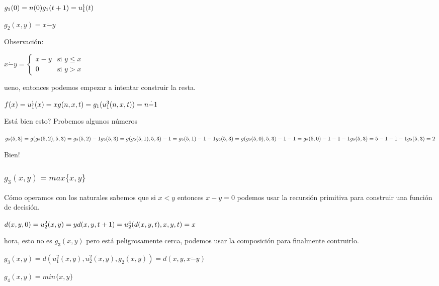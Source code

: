 \documentclass[11pt]{article} %
\newcommand{\desarrollo}[2]{

\hspace{2em}\parbox{\textwidth}{#1}

}
\begin{document}
\desarrollo{$
g_1(0) = n(0)\\
g_1(t+1) = u^1_1(t)
$}

\subsubsection{$g_2(x,y)=x\dot-y$}

Observación:

\desarrollo{$
x\dot-y =
\begin{cases}
  x - y & \text{si } y \le x \\
  0     & \text{si } y > x
\end{cases}
$}

Bueno, entonces podemos empezar a intentar construir la resta.

\desarrollo{$
f(x) = u^1_1(x) = x \\
g(n, x, t) = g_1(u^3_1(n,x,t)) = n \dot- 1
$}

¿Está bien esto? Probemos algunos números

\desarrollo{$
g_2(5, 3) = g(g_2(5, 2), 5, 3) = g_2(5, 2) - 1 \\
g_2(5, 3) = g(g_2(5, 1), 5, 3) - 1 = g_2(5, 1) - 1 - 1 \\
g_2(5, 3) = g(g_2(5, 0), 5, 3) - 1 - 1 = g_2(5, 0) - 1 - 1 - 1 \\
g_2(5, 3) = 5 - 1 - 1 - 1 \\
g_2(5, 3) = 2
$}

¡Bien!

\subsubsection{$g_3(x,y)=max\{x,y\}$}

Cómo operamos con los naturales sabemos que si $x < y$ entonces $x - y = 0$ podemos usar la recursión primitiva para construir una función de decisión.

\desarrollo{$
d(x, y, 0) = u^2_2(x, y) = y \\
d(x, y, t+1) = u^4_2(d(x, y, t), x, y, t) = x
$}

Ahora, esto no es $g_3(x,y)$ pero está peligrosamente cerca, podemos usar la composición para finalmente contruirlo.

\desarrollo{$
g_3(x,y) = d(u^2_1(x, y), u^2_2(x, y), g_2(x,y)) = d(x, y, x \dot- y)
$}

\subsubsection{$g_4(x,y)=min\{x,y\}$}
\end{document}
